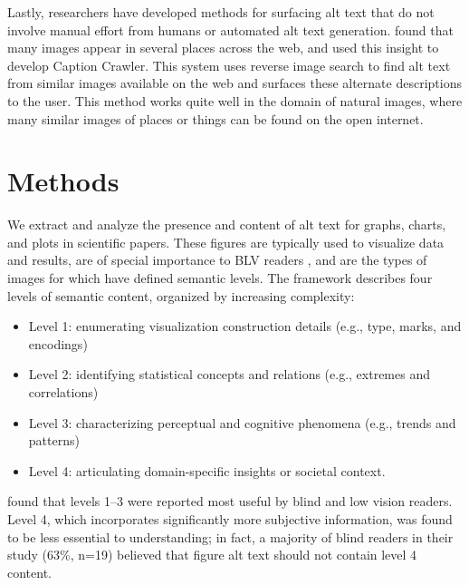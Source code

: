 \documentclass[sigconf]{acmart}
\begin{document}
Lastly, researchers have developed methods for surfacing alt text that do not involve manual effort from humans or automated alt text generation. \citet{Guinness2018CaptionCE} found that many images appear in several places across the web, and used this insight to develop Caption Crawler. This system uses reverse image search to find alt text from similar images available on the web and surfaces these alternate descriptions to the user. This method works quite well in the domain of natural images, where many similar images of places or things can be found on the open internet.






\section{Methods}
\label{sec:methods}

We extract and analyze the presence and content of alt text for graphs, charts, and plots in scientific papers. These figures are typically used to visualize data and results, are of special importance to BLV readers \citep{Mack2021DesigningTF}, and are the types of images for which \citet{Lundgard2022AccessibleVV} have defined semantic levels. The \citet{Lundgard2022AccessibleVV} framework describes four levels of semantic content, organized by increasing complexity: 

\begin{itemize}
    \item Level 1: enumerating visualization construction details (e.g., type, marks, and encodings) 
    \item Level 2: identifying statistical concepts and relations (e.g., extremes and correlations) 
    \item Level 3: characterizing perceptual and cognitive phenomena (e.g., trends and patterns)
    \item Level 4: articulating domain-specific insights or societal context. 
\end{itemize}



\noindent \citet{Lundgard2022AccessibleVV} found that levels 1--3 were reported most useful by blind and low vision readers. Level 4, which incorporates significantly more subjective information, was found to be less essential to understanding; in fact, a majority of blind readers in their study (63\%, n=19) believed that figure alt text should not contain level 4 content.
\end{document}
